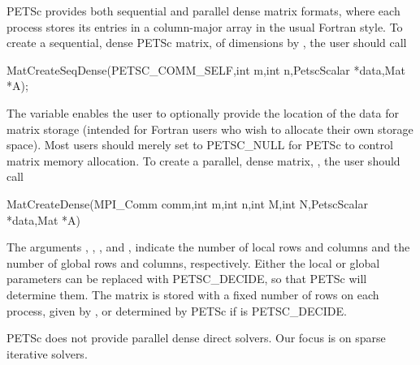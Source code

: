 PETSc provides both sequential and parallel dense matrix formats,
where each process stores its entries in a column-major array in the
usual Fortran style.  To create a sequential, dense PETSc matrix,
 of dimensions  by , the user should
call
\begin{tabbing}
  MatCreateSeqDense(PETSC\_COMM\_SELF,int m,int n,PetscScalar *data,Mat *A);
\end{tabbing}
The variable  enables the user to optionally provide the
location of the data for matrix storage (intended for Fortran users who
wish to allocate their own storage space).  Most users should merely
set  to PETSC\_NULL for PETSc to control matrix memory allocation.
To create a parallel, dense matrix, , the user should call
\begin{tabbing}
  MatCreateDense(MPI\_Comm comm,int m,int n,int M,int N,PetscScalar *data,Mat *A)
\end{tabbing}
The arguments , ,
, and , indicate the number of local rows and columns and
the number of global rows and columns, respectively. Either the local or
global parameters can be replaced with PETSC\_DECIDE, so that
PETSc will determine them.
The matrix is stored with a fixed number of rows on
each process, given by , or determined by PETSc if  is
PETSC\_DECIDE.

PETSc does not provide parallel dense direct solvers. Our focus is on
sparse iterative solvers.

